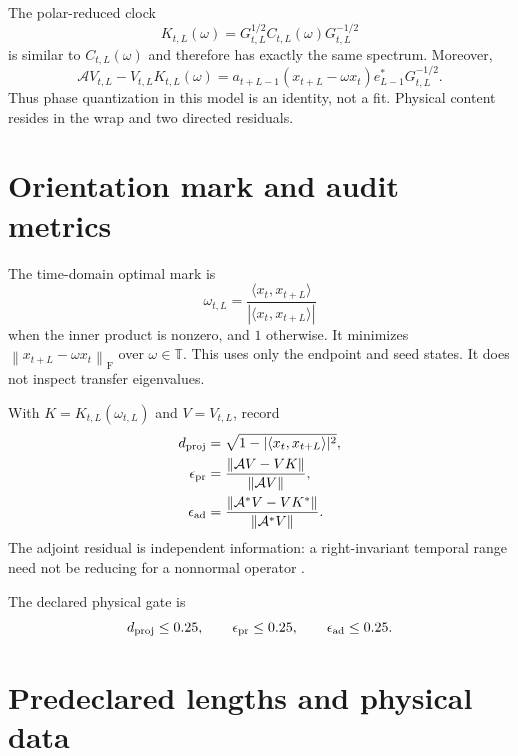 \documentclass[12pt]{article}
\theoremstyle{remark}
\newcommand{\norm}[1]{\left\lVert#1\right\rVert}
\newcommand{\F}{\mathrm F}
\begin{document}
The polar-reduced clock
\begin{equation}\label{eq:polar-clock}
 K_{t,L}(\omega)=G_{t,L}^{1/2}C_{t,L}(\omega)G_{t,L}^{-1/2}
\end{equation}
is similar to $C_{t,L}(\omega)$ and therefore has exactly the same spectrum.
Moreover,
\begin{equation}\label{eq:polar-intertwining}
 \mathcal A V_{t,L}-V_{t,L}K_{t,L}(\omega)
 =a_{t+L-1}(x_{t+L}-\omega x_t)e_{L-1}^*G_{t,L}^{-1/2}.
\end{equation}
Thus phase quantization in this model is an identity, not a fit.  Physical
content resides in the wrap and two directed residuals.

\section{Orientation mark and audit metrics}

The time-domain optimal mark is
\begin{equation}\label{eq:mark}
 \omega_{t,L}=
 \frac{\langle x_t,x_{t+L}\rangle}
 {|\langle x_t,x_{t+L}\rangle|}
\end{equation}
when the inner product is nonzero, and $1$ otherwise.  It minimizes
$\norm{x_{t+L}-\omega x_t}_{\F}$ over $\omega\in\mathbb T$.  This uses only
the endpoint and seed states.  It does not inspect transfer eigenvalues.

With $K=K_{t,L}(\omega_{t,L})$ and $V=V_{t,L}$, record
\begin{align}
 d_{\rm proj}&=
 \sqrt{1-|\langle x_t,x_{t+L}\rangle|^2},
 \label{eq:projective}\\
 \epsilon_{\rm pr}&=
 \frac{\norm{\mathcal AV-VK}}
 {\norm{\mathcal AV}},
 \label{eq:primal}\\
 \epsilon_{\rm ad}&=
 \frac{\norm{\mathcal A^*V-VK^*}}
 {\norm{\mathcal A^*V}}.
 \label{eq:adjoint}
\end{align}
The adjoint residual is independent information: a right-invariant temporal
range need not be reducing for a nonnormal operator \citep{Kato1995}.

The declared physical gate is
\begin{equation}\label{eq:gate}
 d_{\rm proj}\le0.25,
 \qquad \epsilon_{\rm pr}\le0.25,
 \qquad \epsilon_{\rm ad}\le0.25.
\end{equation}

\section{Predeclared lengths and physical data}
\end{document}
